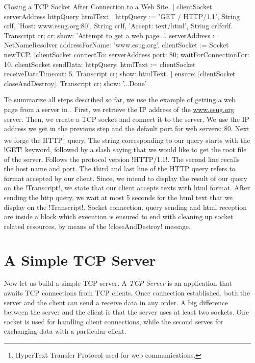 \documentclass[a4paper,10pt,twoside]{book}
\begin{document}
\begin{script}[closeAndDestroy]{Closing a TCP Socket After Connection to a Web Site.}
| clientSocket serverAddress httpQuery htmlText |
httpQuery := 'GET / HTTP/1.1', String crlf, 
	'Host: www.esug.org:80', String crlf, 
	'Accept: text/html', String crlfcrlf.
Transcript cr; cr; show: 'Attempt to get a web page...'.
serverAddress := NetNameResolver addressForName: 'www.esug.org'.
clientSocket := Socket newTCP.
[clientSocket 
	connectTo: serverAddress port: 80;
	waitForConnectionFor: 10.
 clientSocket sendData: httpQuery.
 htmlText  := clientSocket receiveDataTimeout: 5.
 Transcript cr; show: htmlText.
] ensure: [clientSocket closeAndDestroy].
Transcript cr; show: '...Done'
\end{script}

To summarize all steps described so far, we use the example of getting a web page from a server in .
First, we retrieve the IP address of the \url{www.esug.org} server.
Then, we create a TCP socket and connect it to the server.
We use the IP address we get in the previous step and the default port for web servers: 80.
Next we forge the HTTP\footnote{HyperText Transfer Protocol used for web communications.} query.
The string corresponding  to our query starts with the \ct!GET! keyword, followed by a slash saying that we would like to get the root file of the server.
Follows the protocol version \ct!HTTP/1.1!.
The second line recalls the host name and port.
The third and last line of the HTTP query refers to format accepted by our client. 
Since, we intend to display the result of our query on the \ct!Transcript!, we state that our client accepts texts with html format.
After sending the http query, we wait at most 5 seconds for the html text that we display on the \ct!Transcript!.
Socket connection, query sending and html reception are inside a block which execution is ensured to end with cleaning up socket related resources, by means of the \ct!closeAndDestroy! message.

\section{A Simple TCP Server}
Now let us build a simple TCP server. A \textit{TCP Server} is an application that awaits TCP connections from TCP clients. Once connection established, both the server and the client can send a receive data in any order. 
A big difference between the server and the client is that the server uses at least two sockets.
One socket is used for handling client connections, while the second serves for exchanging data with a particular client.
\end{document}
